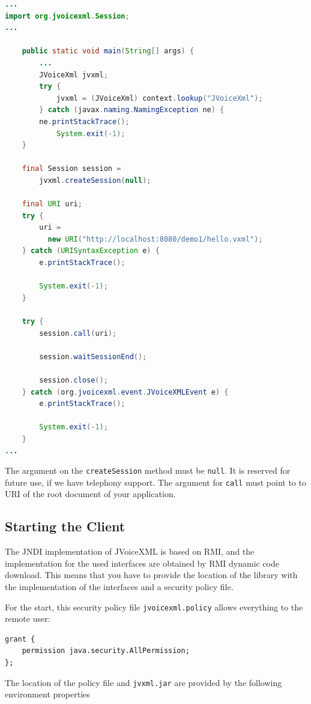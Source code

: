\documentclass[11pt,a4paper]{article}
\begin{document}
\begin{lstlisting}[language=Java]
...
import org.jvoicexml.Session;
...

    public static void main(String[] args) {
        ...
        JVoiceXml jvxml;
        try {
            jvxml = (JVoiceXml) context.lookup("JVoiceXml");
        } catch (javax.naming.NamingException ne) {
	    ne.printStackTrace();
            System.exit(-1);
    }

    final Session session = 
        jvxml.createSession(null);

    final URI uri;
    try {
        uri = 
          new URI("http://localhost:8080/demo1/hello.vxml");
    } catch (URISyntaxException e) {
        e.printStackTrace();

        System.exit(-1);
    }

    try {
        session.call(uri);

        session.waitSessionEnd();

        session.close();
    } catch (org.jvoicexml.event.JVoiceXMLEvent e) {
        e.printStackTrace();

        System.exit(-1);
    }
...
\end{lstlisting}

The argument on the \texttt{createSession} method must be 
\texttt{null}. It is reserved for future use, if we have telephony
support. The argument for \texttt{call} must point to to URI of the
root document of your application.

\subsection{Starting the Client}

The JNDI implementation of JVoiceXML is based on RMI, and
the implementation for the used interfaces are obtained by
RMI dynamic code download. This means that you have to provide
the location of the library with the implementation of the
interfaces and a security policy file.

For the start, this security policy file \texttt{jvoicexml.policy}
allows everything to the remote user:

\begin{lstlisting}
grant {
    permission java.security.AllPermission;
};
\end{lstlisting}

The location of the policy file and \texttt{jvxml.jar} are provided by the 
following environment properties
\end{document}
